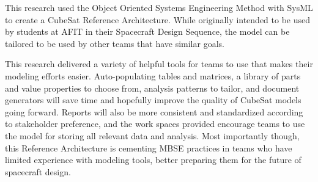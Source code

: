 
This research used the Object Oriented Systems Engineering Method with SysML to create a CubeSat Reference Architecture. While originally intended to be used by students at AFIT in their Spacecraft Design Sequence, the model can be tailored to be used by other teams that have similar goals. 

This research delivered a variety of helpful tools for teams to use that makes their modeling efforts easier. Auto-populating tables and matrices, a library of parts and value properties to choose from, analysis patterns to tailor, and document generators will save time and hopefully improve the quality of CubeSat models going forward. Reports will also be more consistent and standardized according to stakeholder preference, and the work spaces provided encourage teams to use the model for storing all relevant data and analysis. Most importantly though, this Reference Architecture is cementing MBSE practices in teams who have limited experience with modeling tools, better preparing them for the future of spacecraft design.